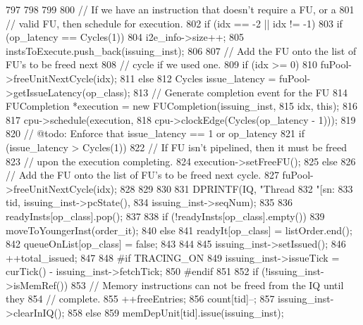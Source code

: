 \begin{DoxyCode}
{{{{797             }
798         }
799 
800         // If we have an instruction that doesn't require a FU, or a
801         // valid FU, then schedule for execution.
802         if (idx == -2 || idx != -1) {
803             if (op_latency == Cycles(1)) {
804                 i2e_info->size++;
805                 instsToExecute.push_back(issuing_inst);
806 
807                 // Add the FU onto the list of FU's to be freed next
808                 // cycle if we used one.
809                 if (idx >= 0)
810                     fuPool->freeUnitNextCycle(idx);
811             } else {
812                 Cycles issue_latency = fuPool->getIssueLatency(op_class);
813                 // Generate completion event for the FU
814                 FUCompletion *execution = new FUCompletion(issuing_inst,
815                                                            idx, this);
816 
817                 cpu->schedule(execution,
818                               cpu->clockEdge(Cycles(op_latency - 1)));
819 
820                 // @todo: Enforce that issue_latency == 1 or op_latency
821                 if (issue_latency > Cycles(1)) {
822                     // If FU isn't pipelined, then it must be freed
823                     // upon the execution completing.
824                     execution->setFreeFU();
825                 } else {
826                     // Add the FU onto the list of FU's to be freed next cycle.
827                     fuPool->freeUnitNextCycle(idx);
828                 }
829             }
830 
831             DPRINTF(IQ, "Thread %
832                     "[sn:%
833                     tid, issuing_inst->pcState(),
834                     issuing_inst->seqNum);
835 
836             readyInsts[op_class].pop();
837 
838             if (!readyInsts[op_class].empty()) {
839                 moveToYoungerInst(order_it);
840             } else {
841                 readyIt[op_class] = listOrder.end();
842                 queueOnList[op_class] = false;
843             }
844 
845             issuing_inst->setIssued();
846             ++total_issued;
847 
848 #if TRACING_ON
849             issuing_inst->issueTick = curTick() - issuing_inst->fetchTick;
850 #endif
851 
852             if (!issuing_inst->isMemRef()) {
853                 // Memory instructions can not be freed from the IQ until they
854                 // complete.
855                 ++freeEntries;
856                 count[tid]--;
857                 issuing_inst->clearInIQ();
858             } else {
859                 memDepUnit[tid].issue(issuing_inst);
}}}}
\end{DoxyCode}
